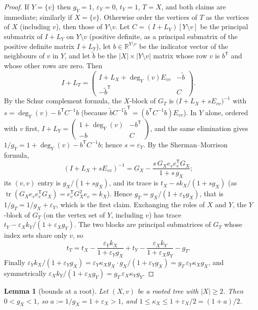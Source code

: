 \documentclass[11pt]{amsart}
\newtheorem{lemma}[theorem]{Lemma}
\theoremstyle{definition}
\theoremstyle{remark}
\newcommand{\tr}{\operatorname{tr}}
\begin{document}
\begin{proof}
If $Y=\{v\}$ then $g_Y=1$, $\varepsilon_Y=0$, $t_Y=1$, $T=X$, and both claims
are immediate; similarly if $X=\{v\}$. Otherwise order the vertices of $T$ as
the vertices of $X$ (including $v$), then those of $Y\setminus v$. Let
$C=(I+L_Y)[Y\setminus v]$ be the principal submatrix of $I+L_Y$ on
$Y\setminus v$ (positive definite, as a principal submatrix of the positive
definite matrix $I+L_Y$), let $b\in\mathbb R^{Y\setminus v}$ be the indicator
vector of the neighbours of $v$ in $Y$, and let $\tilde b$ be the
$|X|\times|Y\setminus v|$ matrix whose row $v$ is $b^{\mathsf T}$ and whose
other rows are zero. Then
\[
I+L_T=\begin{pmatrix}I+L_X+\deg_Y(v)E_{vv}&-\tilde b\\-\tilde b^{\mathsf T}&C\end{pmatrix}.
\]
By the Schur complement formula, the $X$-block of $G_T$ is
$\bigl(I+L_X+sE_{vv}\bigr)^{-1}$ with $s=\deg_Y(v)-b^{\mathsf T}C^{-1}b$
(because $\tilde bC^{-1}\tilde b^{\mathsf T}=(b^{\mathsf T}C^{-1}b)E_{vv}$).
In $Y$ alone, ordered with $v$ first,
$I+L_Y=\begin{pmatrix}1+\deg_Y(v)&-b^{\mathsf T}\\-b&C\end{pmatrix}$, and the
same elimination gives $1/g_Y=1+\deg_Y(v)-b^{\mathsf T}C^{-1}b$; hence
$s=\varepsilon_Y$. By the Sherman--Morrison formula,
\[
(I+L_X+sE_{vv})^{-1}=G_X-\frac{s\,G_Xe_ve_v^{\mathsf T}G_X}{1+s\,g_X};
\]
its $(v,v)$ entry is $g_X/(1+sg_X)$, and its trace is
$t_X-sk_X/(1+sg_X)$ (as $\tr(G_Xe_ve_v^{\mathsf T}G_X)=e_v^{\mathsf T}G_X^2e_v=k_X$).
Hence $g_T=g_X/(1+\varepsilon_Yg_X)$, that is $1/g_T=1/g_X+\varepsilon_Y$,
which is the first claim. Exchanging the roles of $X$ and $Y$, the
$Y$-block of $G_T$ (on the vertex set of $Y$, including $v$) has trace
$t_Y-\varepsilon_Xk_Y/(1+\varepsilon_Xg_Y)$. The two blocks are principal
submatrices of $G_T$ whose index sets share only $v$, so
\[
t_T=t_X-\frac{\varepsilon_Yk_X}{1+\varepsilon_Yg_X}+t_Y-\frac{\varepsilon_Xk_Y}{1+\varepsilon_Xg_Y}-g_T .
\]
Finally
$\varepsilon_Yk_X/(1+\varepsilon_Yg_X)=\varepsilon_Y\kappa_Xg_X\cdot g_X/(1+\varepsilon_Yg_X)=g_T\,\varepsilon_Y\kappa_Xg_X$,
and symmetrically $\varepsilon_Xk_Y/(1+\varepsilon_Xg_Y)=g_T\,\varepsilon_X\kappa_Yg_Y$.
\end{proof}

\begin{lemma}[bounds at a root]\label{lem:S43p}
Let $(X,v)$ be a rooted tree with $|X|\ge2$. Then $0<g_X<1$, so
$a:=1/g_X=1+\varepsilon_X>1$, and $1\le\kappa_X\le1+\varepsilon_X/2=(1+a)/2$.
\end{lemma}
\end{document}
